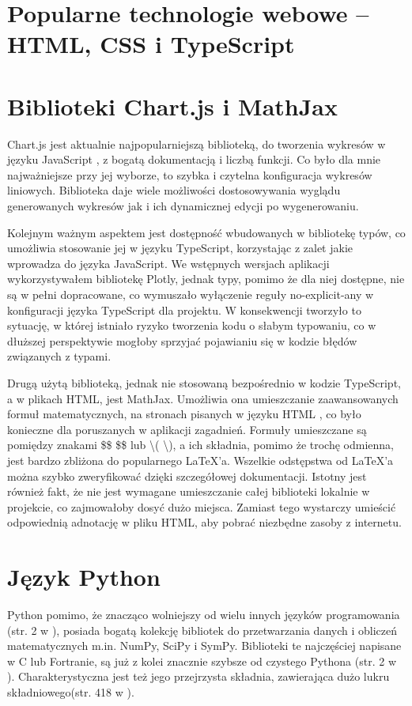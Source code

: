 \documentclass{SGGW-thesis}
\begin{document}
	\section{Popularne technologie webowe -- HTML, CSS i TypeScript}
	
	\section{Biblioteki Chart.js i MathJax}
	Chart.js jest aktualnie najpopularniejszą biblioteką, do tworzenia wykresów w języku JavaScript \cite{chartjs}, z bogatą dokumentacją i liczbą funkcji. Co było dla mnie najważniejsze przy jej wyborze, to szybka i czytelna konfiguracja wykresów liniowych. Biblioteka daje wiele możliwości dostosowywania wyglądu generowanych wykresów jak i ich dynamicznej edycji po wygenerowaniu.
	
	Kolejnym ważnym aspektem jest dostępność wbudowanych w bibliotekę typów, co umożliwia stosowanie jej w języku TypeScript, korzystając z zalet jakie wprowadza do języka JavaScript. We wstępnych wersjach aplikacji wykorzystywałem bibliotekę Plotly, jednak typy, pomimo że dla niej dostępne, nie są w pełni dopracowane, co wymuszało wyłączenie reguły no-explicit-any w konfiguracji języka TypeScript dla projektu. W konsekwencji tworzyło to sytuację, w której istniało ryzyko tworzenia kodu o słabym typowaniu, co w dłuższej perspektywie mogłoby sprzyjać pojawianiu się w kodzie błędów związanych z typami.
	
	Drugą użytą biblioteką, jednak nie stosowaną bezpośrednio w kodzie TypeScript, a w plikach HTML, jest MathJax. Umożliwia ona umieszczanie zaawansowanych formuł matematycznych, na stronach pisanych w języku HTML \cite{mathjax}, co było konieczne dla poruszanych w aplikacji zagadnień. Formuły umieszczane są pomiędzy znakami \$\$ \$\$ lub \textbackslash( \textbackslash), a ich składnia, pomimo że trochę odmienna, jest bardzo zbliżona do popularnego LaTeX'a. Wszelkie odstępstwa od LaTeX'a można szybko zweryfikować dzięki szczegółowej dokumentacji. Istotny jest również fakt, że nie jest wymagane umieszczanie całej biblioteki lokalnie w projekcie, co zajmowałoby dosyć dużo miejsca. Zamiast tego wystarczy umieścić odpowiednią adnotację w pliku HTML, aby pobrać niezbędne zasoby z internetu.
	
	\section{Język Python}
	Python pomimo, że znacząco wolniejszy od wielu innych języków programowania (str. 2 w  \cite{Python}), posiada bogatą kolekcję bibliotek do przetwarzania danych i obliczeń matematycznych m.in. NumPy, SciPy i SymPy. Biblioteki te najczęściej napisane w C lub Fortranie, są już z kolei znacznie szybsze od czystego Pythona (str. 2 w \cite{Python}). Charakterystyczna jest też jego przejrzysta składnia, zawierająca dużo lukru składniowego(str. 418 w \cite{Python}).
	
\end{document}
